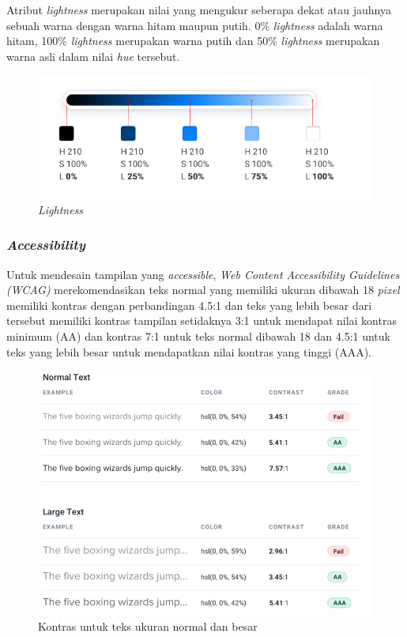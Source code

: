Atribut \textit{lightness} merupakan nilai yang mengukur seberapa dekat atau jauhnya sebuah warna dengan warna hitam maupun putih. 0\% \textit{lightness} adalah warna hitam, 100\% \textit{lightness} merupakan warna putih dan 50\% \textit{lightness} merupakan warna asli dalam nilai \textit{hue} tersebut.

\begin{figure}[H]
	{\centering
		\includegraphics[keepaspectratio, width=12cm]{gambar/refactoring-ui-32.png}
		\caption{\textit{Lightness} \citep{refactoringui}}}
	\label{gambar:refactoring-ui-32.png}
\end{figure}

\subsubsection{\textit{Accessibility}}
Untuk mendesain tampilan yang \textit{accessible}, \textit{Web Content Accessibility Guidelines (WCAG)} merekomendasikan teks normal yang memiliki ukuran dibawah 18 \textit{pixel} memiliki kontras dengan perbandingan 4.5:1 dan teks yang lebih besar dari tersebut memiliki kontras tampilan setidaknya 3:1 untuk mendapat nilai kontras minimum (AA) dan kontras 7:1 untuk teks normal dibawah 18 dan 4.5:1 untuk teks yang lebih besar untuk mendapatkan nilai kontras yang tinggi (AAA).
\begin{figure}[H]
	{\centering
		\includegraphics[keepaspectratio, width=12cm]{gambar/g-101.png}
		\caption{Kontras untuk teks ukuran normal dan besar \citep{refactoringui}}}
	\label{gambar:g-101.png}
\end{figure}

